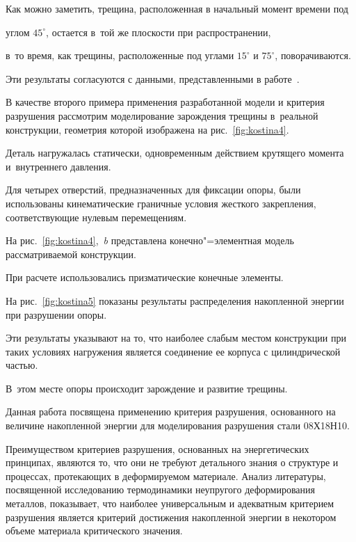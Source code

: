 \smallskip





Как можно заметить, трещина, расположенная в начальный момент времени под

углом $45^\circ$, остается в~той же плоскости при распространении, 

в~то время, как трещины, расположенные под углами $15^\circ$ и $75^\circ$, поворачиваются. 

Эти результаты согласуются с данными, представленными в работе~\cite{kostina:bib:Rabold}.







В качестве второго примера применения разработанной модели и критерия разрушения рассмотрим моделирование зарождения трещины в~реальной конструкции, геометрия которой изображена на рис.~\ref{fig:kostina4}.

Деталь нагружалась статически, одновременным действием крутящего момента и~внутреннего давления. 

Для четырех отверстий, предназначенных для фиксации опоры, были использованы кинематические граничные условия жесткого закрепления, соответствующие нулевым перемещениям.  

На рис.~\ref{fig:kostina4},~{\sl b} представлена конечно"=элементная модель рассматриваемой конструкции. 

При расчете использовались призматические конечные элементы.



На рис.~\ref{fig:kostina5} показаны результаты распределения накопленной энергии при разрушении опоры.

Эти результаты указывают на то, что наиболее слабым местом конструкции при таких условиях нагружения является соединение ее корпуса с цилиндрической частью.

В~этом месте опоры происходит зарождение и развитие трещины.








Данная работа посвящена применению критерия разрушения, основанного на величине накопленной энергии для моделирования разрушения стали 08Х18Н10. 

Преимуществом критериев разрушения, основанных на энергетических принципах, являются то, что они не требуют детального знания о структуре и процессах, протекающих в деформируемом материале. Анализ литературы, посвященной исследованию термодинамики неупругого деформирования металлов, показывает, что наиболее универсальным и адекватным критерием разрушения является критерий достижения накопленной энергии в некотором объеме материала критического значения.



